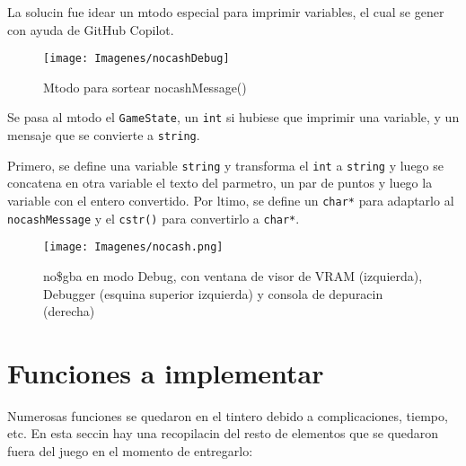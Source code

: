 \documentclass[12pt]{article}
\begin{document}
    La solucin fue idear un mtodo especial para imprimir variables, el cual se gener con ayuda de GitHub Copilot.

    \begin{figure}[H]
      \centering
      \texttt{[image: Imagenes/nocashDebug]}
      \caption{Mtodo para sortear nocashMessage()}
      \label{fig:nocashdebug}
    \end{figure}

    Se pasa al mtodo el \texttt{GameState}, un \texttt{int} si hubiese que imprimir una variable, y un mensaje que se convierte a \texttt{string}.

    Primero, se define una variable \texttt{string} y transforma el \texttt{int} a \texttt{string} y luego se concatena en otra variable el texto del parmetro, un par de puntos y luego la variable con el entero convertido. Por ltimo, se define un \texttt{char*} para adaptarlo al \texttt{nocashMessage} y el \texttt{c\textunderscore str()} para convertirlo a \texttt{char*}.

    \begin{figure}[H]
      \centering
      \texttt{[image: Imagenes/nocash.png]}
      \caption{no\$gba en modo Debug, con ventana de visor de VRAM (izquierda), Debugger (esquina superior izquierda) y consola de depuracin (derecha)}
      \label{fig:nocash}
    \end{figure}


\newpage
\section{Funciones a implementar}
  Numerosas funciones se quedaron en el tintero debido a complicaciones, tiempo, etc. En esta seccin hay una recopilacin del resto de elementos que se quedaron fuera del juego en el momento de entregarlo:
\end{document}
